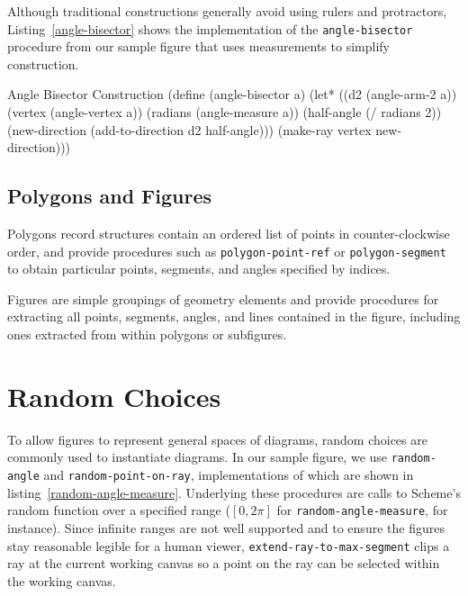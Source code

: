 Although traditional constructions generally avoid using rulers and
protractors, Listing~\ref{angle-bisector} shows the implementation of
the \texttt{angle-bisector} procedure from our sample figure that uses
measurements to simplify construction.

\begin{code-listing}
[label=angle-bisector]
{Angle Bisector Construction}
(define (angle-bisector a)
  (let* ((d2 (angle-arm-2 a))
         (vertex (angle-vertex a))
         (radians (angle-measure a))
         (half-angle (/ radians 2))
         (new-direction (add-to-direction d2 half-angle)))
    (make-ray vertex new-direction)))
\end{code-listing}

\subsection{Polygons and Figures}

Polygons record structures contain an ordered list of points in
counter-clockwise order, and provide procedures such as
\texttt{polygon-point-ref} or \texttt{polygon-segment} to obtain
particular points, segments, and angles specified by indices.

Figures are simple groupings of geometry elements and provide
procedures for extracting all points, segments, angles,
and lines contained in the figure, including ones extracted from within
polygons or subfigures.

\section{Random Choices}

To allow figures to represent general spaces of diagrams, random
choices are commonly used to instantiate diagrams. In our sample
figure, we use \texttt{random-angle} and \texttt{random-point-on-ray},
implementations of which are shown in
listing~\ref{random-angle-measure}. Underlying these procedures are
calls to Scheme's random function over a specified range ($[0, 2\pi]$
for \texttt{random-angle-measure}, for instance). Since infinite
ranges are not well supported and to ensure the figures stay
reasonable legible for a human viewer,
\texttt{extend-ray-to-max-segment} clips a ray at the current working
canvas so a point on the ray can be selected within the working
canvas.

